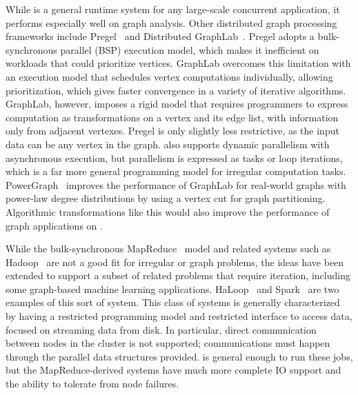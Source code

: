 \vspace{0.5ex}
While \Grappa is a general runtime system for any large-scale
concurrent application, it performs especially
well on graph analysis. Other distributed graph processing frameworks
include Pregel~\cite{pregel:2010} and Distributed
GraphLab~\cite{distgraphlab:vldb12}. Pregel adopts a bulk-synchronous
parallel (BSP) execution model, which makes it inefficient on
workloads that could prioritize vertices. GraphLab overcomes this
limitation with an execution model that schedules vertex computations
individually, allowing prioritization, which gives faster convergence
in a variety of iterative algorithms. GraphLab, however, imposes a
rigid model that requires programmers to express computation as
transformations on a vertex and its edge list, with information only
from adjacent vertexes. Pregel is only slightly less restrictive, as
the input data can be any vertex in the graph. \Grappa also supports
dynamic parallelism with asynchronous execution, but parallelism is
expressed as tasks or loop iterations, which is a far more general
programming model for irregular computation tasks.
PowerGraph~\cite{powergraph:osdi12} improves the performance of
GraphLab for real-world graphs with power-law degree distributions by
using a vertex cut for graph partitioning. Algorithmic transformations
like this would also improve the
performance of graph applications on \Grappa.

While the bulk-synchronous MapReduce~\cite{Dean:2008:MSD:1327452.1327492} model and
related systems such as Hadoop~\cite{hadoop} are not a good fit for
irregular or graph problems, the ideas have been extended to support a
subset of related problems that require iteration, including some
graph-based machine learning
applications. HaLoop~\cite{Bu:2010:HEI:1920841.1920881} and
Spark~\cite{Zaharia:2010:SCC:1863103.1863113} are two examples of this
sort of system. This class of systems is generally characterized by
having a restricted programming model and restricted interface to
access data, focused on streaming data from disk. In particular,
direct communication between nodes in the cluster is not supported;
communications must happen through the  parallel data
structures provided. \Grappa is general enough to run these jobs, but the
MapReduce-derived systems have much more complete IO support and the
ability to tolerate from node failures.


